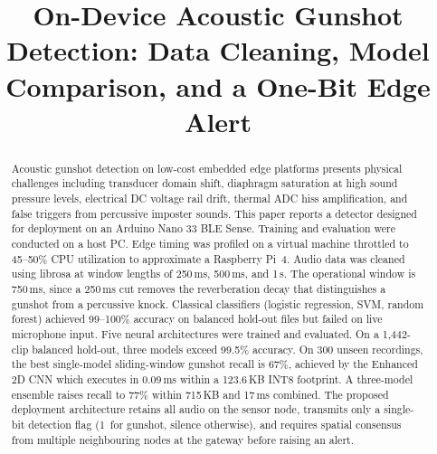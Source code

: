 \documentclass[conference]{IEEEtran}
\begin{document}
\title{On-Device Acoustic Gunshot Detection: Data Cleaning, Model Comparison, and a One-Bit Edge Alert}

\author{
\and
{}
\and
{}
}

\maketitle

\begin{abstract}
Acoustic gunshot detection on low-cost embedded edge platforms presents physical challenges including transducer domain shift, diaphragm saturation at high sound pressure levels, electrical DC voltage rail drift, thermal ADC hiss amplification, and false triggers from percussive imposter sounds. This paper reports a detector designed for deployment on an Arduino Nano 33 BLE Sense. Training and evaluation were conducted on a host PC. Edge timing was profiled on a virtual machine throttled to 45--50\% CPU utilization to approximate a Raspberry Pi~4. Audio data was cleaned using librosa at window lengths of 250\,ms, 500\,ms, and 1\,s. The operational window is 750\,ms, since a 250\,ms cut removes the reverberation decay that distinguishes a gunshot from a percussive knock. Classical classifiers (logistic regression, SVM, random forest) achieved 99--100\% accuracy on balanced hold-out files but failed on live microphone input. Five neural architectures were trained and evaluated. On a 1{,}442-clip balanced hold-out, three models exceed 99.5\% accuracy. On 300 unseen recordings, the best single-model sliding-window gunshot recall is 67\%, achieved by the Enhanced 2D CNN which executes in 0.09\,ms within a 123.6\,KB INT8 footprint. A three-model ensemble raises recall to 77\% within 715\,KB and 17\,ms combined. The proposed deployment architecture retains all audio on the sensor node, transmits only a single-bit detection flag (1~for gunshot, silence otherwise), and requires spatial consensus from multiple neighbouring nodes at the gateway before raising an alert.
\end{abstract}
\end{document}
